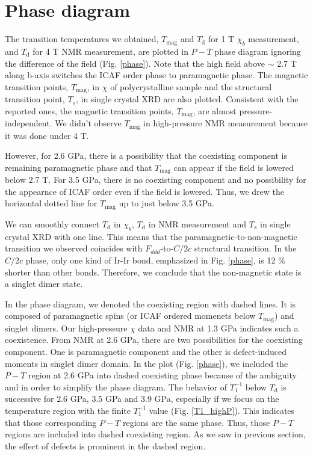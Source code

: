 \newpage
\section{Phase diagram}
The transition temperatures we obtained, $T_{\mathrm{mag}}$ and $T_\mathrm{d}$ for 1 T $\chi_b$ measurement, and $T_\mathrm{d}$ for 4 T NMR measurement,
are plotted in $P-T$ phase diagram ignoring the difference of the field (Fig. \ref{phase}).
Note that the high field above $\sim$ 2.7 T along b-axis switches the ICAF order phase to paramagnetic phase.
The magnetic transition points, $T_{\mathrm{mag}}$, in $\chi$ of polycrystalline sample \cite{Majumder2018}
and the structural transition point, $T_s$, in single crystal XRD \cite{veiga2017pressure} are also plotted.
Consistent with the reported ones, the magnetic transition points, $T_{\mathrm{mag}}$, are almost pressure-independent.
We didn't observe $T_{\mathrm{mag}}$ in high-pressure NMR measurement because it was done under 4 T.
\begin{comment}
However, the coexisting component at 1.3 GPa is paramagnetic one.
It implies that, at least at 1.3 GPa, $T_{\mathrm{mag}}$ should appear if the field is lowered below 2.7 T because the paramagnetic phase should become ICAF order moments below 2.7 T.
\end{comment}
However, for 2.6 GPa, there is a possibility that the coexisting component is remaining paramagnetic phase and that $T_{\mathrm{mag}}$ can appear if the field is lowered below 2.7 T.
For 3.5 GPa, there is no coexisting component and no possibility for the appearnce of ICAF order even if the field is lowered.
Thus, we drew the horizontal dotted line for $T_{\mathrm{mag}}$ up to just below 3.5 GPa.

We can smoothly connect $T_\mathrm{d}$ in $\chi_b$, $T_\mathrm{d}$ in NMR measurement and $T_s$ in single crystal XRD with one line.
This means that the paramagnetic-to-non-magnetic transition we observed coincides with $F_{ddd}$-to-$C/2c$ structural transition.
In the $C/2c$ phase, only one kind of Ir-Ir bond, emphasized in Fig. \ref{phase}, is 12 \% shorter than other bonds.
Therefore, we conclude that the non-magnetic state is a singlet dimer state.

In the phase diagram, we denoted the coexisting region with dashed lines.
It is composed of paramagnetic spins (or ICAF ordered momenets below $T_\mathrm{mag}$) and singlet dimers.
Our high-pressure $\chi$ data and NMR at 1.3 GPa indicates such a coexistence.
From NMR at 2.6 GPa, there are two possibilities for the coexisting component.
One is paramagnetic component and  the other is defect-induced moments in singlet dimer domain.
In the plot (Fig. \ref{phase}), we included the $P-T$ region at 2.6 GPa into dashed coexisting phase because of the ambiguity and in order to simplify the phase diagram.
The behavior of $T^{-1}_1$ below $T_\mathrm{d}$ is successive for 2.6 GPa, 3.5 GPa and 3.9 GPa, especially if we focus on the temperature region with the finite $T^{-1}_1$ value
(Fig. \ref{T1_highP}).
This indicates that those corresponding $P-T$ regions are the same phase.
Thus, those $P-T$ regions are included into dashed coexisting region.
As we saw in previous section, the effect of defects is prominent in the dashed region.


